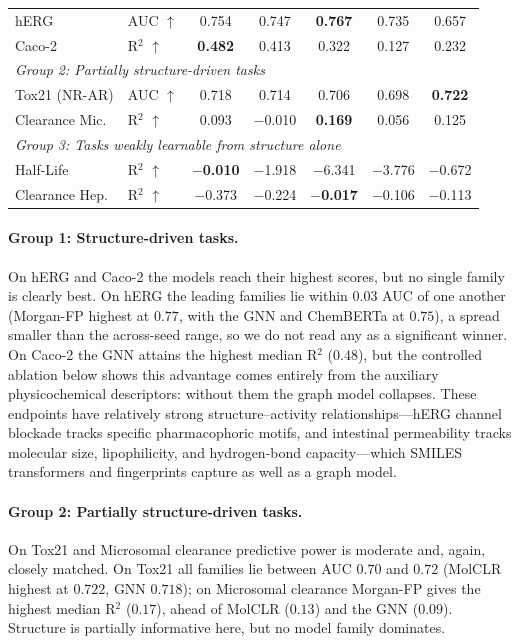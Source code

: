 \documentclass[journal]{IEEEtran}
\begin{document}
\begin{table}[!t]
\begin{tabular}{llccccc}
\midrule
hERG & AUC $\uparrow$ & 0.754 & 0.747 & \textbf{0.767} & 0.735 & 0.657 \\
Caco-2 & R$^2$ $\uparrow$ & \textbf{0.482} & 0.413 & 0.322 & 0.127 & 0.232 \\
\midrule
\multicolumn{7}{l}{\emph{Group 2: Partially structure-driven tasks}} \\
\midrule
Tox21 (NR-AR) & AUC $\uparrow$ & 0.718 & 0.714 & 0.706 & 0.698 & \textbf{0.722} \\
Clearance Mic. & R$^2$ $\uparrow$ & 0.093 & $-$0.010 & \textbf{0.169} & 0.056 & 0.125 \\
\midrule
\multicolumn{7}{l}{\emph{Group 3: Tasks weakly learnable from structure alone}} \\
\midrule
Half-Life & R$^2$ $\uparrow$ & \textbf{$-$0.010} & $-$1.918 & $-$6.341 & $-$3.776 & $-$0.672 \\
Clearance Hep. & R$^2$ $\uparrow$ & $-$0.373 & $-$0.224 & \textbf{$-$0.017} & $-$0.106 & $-$0.113 \\
\bottomrule
\end{tabular}
\end{table}

\paragraph{Group 1: Structure-driven tasks.}
On hERG and Caco-2 the models reach their highest scores, but no single family is clearly best. On hERG the leading families lie within $0.03$ AUC of one another (Morgan-FP highest at $0.77$, with the GNN and ChemBERTa at $0.75$), a spread smaller than the across-seed range, so we do not read any as a significant winner. On Caco-2 the GNN attains the highest median R$^2$ ($0.48$), but the controlled ablation below shows this advantage comes entirely from the auxiliary physicochemical descriptors: without them the graph model collapses. These endpoints have relatively strong structure--activity relationships---hERG channel blockade tracks specific pharmacophoric motifs, and intestinal permeability tracks molecular size, lipophilicity, and hydrogen-bond capacity---which SMILES transformers and fingerprints capture as well as a graph model.

\paragraph{Group 2: Partially structure-driven tasks.}
On Tox21 and Microsomal clearance predictive power is moderate and, again, closely matched. On Tox21 all families lie between AUC $0.70$ and $0.72$ (MolCLR highest at $0.722$, GNN $0.718$); on Microsomal clearance Morgan-FP gives the highest median R$^2$ ($0.17$), ahead of MolCLR ($0.13$) and the GNN ($0.09$). Structure is partially informative here, but no model family dominates.
\end{document}
